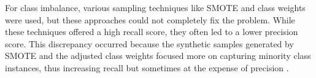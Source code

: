 \documentclass[11pt,article,oneside]{article}
\begin{document}
For class imbalance, various sampling techniques like SMOTE and class weights were used, but these approaches 
could not completely fix the problem. While these techniques offered a high recall score, they often led to a lower 
precision score. This discrepancy occurred because the synthetic samples generated by SMOTE and the adjusted class weights 
focused more on capturing minority class instances, thus increasing recall but sometimes at the expense of precision \cite{rnd1}.  

\printbibliography
\end{document}
